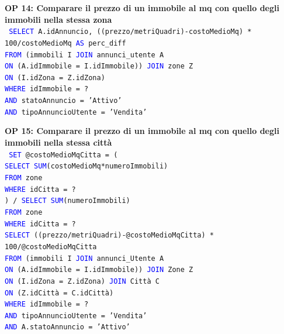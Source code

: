 \documentclass[a4paper,12pt]{report}
\begin{document}
            \noindent
            \textbf{OP 14: Comparare il prezzo di un immobile al mq con quello degli immobili nella stessa zona} \\
            \texttt{
                \textcolor{blue}{SELECT} A.idAnnuncio, ((prezzo/metriQuadri)-costoMedioMq) * 100/costoMedioMq \textcolor{blue}{AS} perc\_diff\\
                \textcolor{blue}{FROM} (immobili I \textcolor{blue}{JOIN} annunci\_utente A  \\
                \textcolor{blue}{ON} (A.idImmobile = I.idImmobile)) \textcolor{blue}{JOIN} zone Z \\
                \textcolor{blue}{ON} (I.idZona = Z.idZona) \\
                \textcolor{blue}{WHERE} idImmobile = ? \\
                \textcolor{blue}{AND} statoAnnuncio = 'Attivo' \\
                \textcolor{blue}{AND} tipoAnnuncioUtente = 'Vendita' \\
            }
            
            \noindent
            \textbf{OP 15: Comparare il prezzo di un immobile al mq con quello degli immobili nella stessa città} \\
            \texttt{
                \textcolor{blue}{SET} @costoMedioMqCitta = (\\
                    \null\qquad\textcolor{blue}{SELECT SUM}(costoMedioMq*numeroImmobili) \\
                    \null\qquad \textcolor{blue}{FROM} zone \\
                    \null\qquad \textcolor{blue}{WHERE} idCitta = ? \\
                    \null\qquad) / \textcolor{blue}{SELECT SUM}(numeroImmobili) \\
                    \null\qquad\textcolor{blue}{FROM} zone  \\
                    \null\qquad\textcolor{blue}{WHERE} idCitta = ? \\
                \textcolor{blue}{SELECT} ((prezzo/metriQuadri)-@costoMedioMqCitta) * 100/@costoMedioMqCitta \\
                \textcolor{blue}{FROM} (immobili I \textcolor{blue}{JOIN} annunci\_Utente A  \\
                \textcolor{blue}{ON} (A.idImmobile = I.idImmobile)) \textcolor{blue}{JOIN} Zone Z \\
                \textcolor{blue}{ON} (I.idZona = Z.idZona) \textcolor{blue}{JOIN} Città C \\
                \textcolor{blue}{ON} (Z.idCittà = C.idCittà) \\
                \textcolor{blue}{WHERE} idImmobile = ? \\
                \textcolor{blue}{AND} tipoAnnuncioUtente = 'Vendita' \\
                \textcolor{blue}{AND} A.statoAnnuncio = 'Attivo' \\
            }
\end{document}
